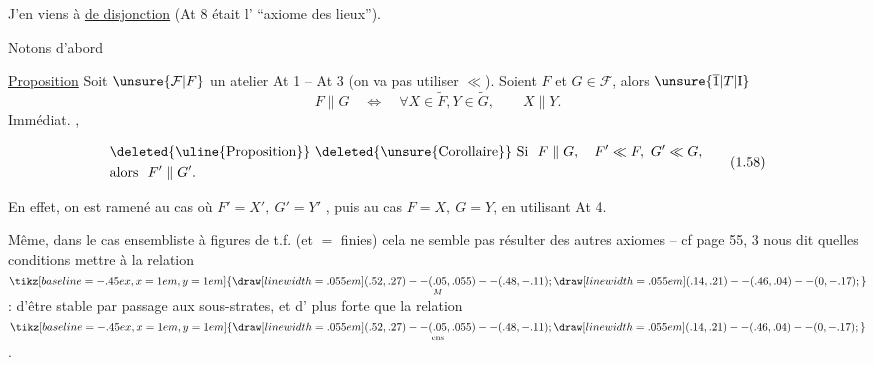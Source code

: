 J'en viens à  \uline{ de disjonction}
(At 8 était l' ``axiome des lieux'').

Notons d'abord

 

\uline{Proposition} Soit $\unsure{\mathcal F|F}$ un atelier
At 1 -- At 3 (on  va pas utiliser $\ll$).
Soient $F$ et $G\in\mathcal F$, alors $\unsure{\overline{1}|T|\mathrm{I}}$
\[
F\parallel G\quad\Longleftrightarrow\quad\forall X\in\widetilde F,Y\in\widetilde G,\qquad X\parallel Y.
\]
Immédiat. ,  

\begingroup\makeatletter\tagsleft@true\makeatother
\[
\begin{aligned}
&\text{\deleted{\uline{Proposition}} \deleted{\unsure{Corollaire}} Si }\ F\parallel G,\quad F'\ll F,\ G'\ll G,\\
&\text{alors }\ F'\parallel G'.
\end{aligned}
\tag*{(1.58)}
\]
\endgroup

En effet,  on est ramené au cas où
$F'=X',\ G'=Y'$ , puis au cas
$F=X,\ G=Y$, en utilisant At 4.

Même, dans le cas ensembliste à figures de t.f.
(et $=$ finies) cela ne semble pas résulter
des autres axiomes -- cf page 55,
 3 nous dit quelles conditions
mettre à la relation $\underset{M}{\mathrel{\tikz[baseline=-.45ex,x=1em,y=1em]{\draw[line width=.055em] (.52,.27)--(.05,.055)--(.48,-.11); \draw[line width=.055em] (.14,.21)--(.46,.04)--(0,-.17);}}}$  : d'être
stable par passage aux sous-strates, et
d'  plus forte que la relation $\underset{\mathrm{ens}}{\mathrel{\tikz[baseline=-.45ex,x=1em,y=1em]{\draw[line width=.055em] (.52,.27)--(.05,.055)--(.48,-.11); \draw[line width=.055em] (.14,.21)--(.46,.04)--(0,-.17);}}}$.
